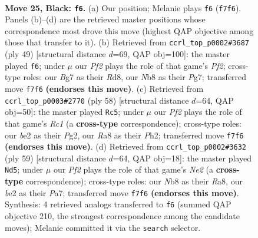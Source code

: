 \documentclass[11pt]{article}
\begin{document}
\clearpage

\begin{figure}[p]\centering
\begin{subfigure}{0.46\textwidth}\centering
\resizebox{\linewidth}{!}{%
\newchessgame
\chessboard[
  setfen={rn3k2/p1r2pbp/Pp6/1P1nN2R/4pPP1/8/4B3/R1B1K3 b Q - 2 25},
  showmover=false,
  pgfstyle=straightmove, color=movearrow, markmove={f7-f6}
]}
\caption{}
\end{subfigure}\hfill
\begin{subfigure}{0.46\textwidth}\centering
\resizebox{\linewidth}{!}{%
\newchessgame
\chessboard[
  setfen={3r1bk1/p4pp1/1pnNr2p/3RP3/1PP3P1/P5B1/7P/2R4K b - - 5 25},
  showmover=false,
  pgfstyle=straightmove, color=movearrow, markmove={f7-f6}
]}
\caption{}
\end{subfigure}
\\[4pt]
\begin{subfigure}{0.46\textwidth}\centering
\resizebox{\linewidth}{!}{%
\newchessgame
\chessboard[
  setfen={r7/1r3pk1/2N1pb1p/p2n2p1/3B4/P4P2/KP1R2PP/2R5 w - - 2 30},
  showmover=false,
  pgfstyle=straightmove, color=movearrow, markmove={c1-c5}
]}
\caption{}
\end{subfigure}\hfill
\begin{subfigure}{0.46\textwidth}\centering
\resizebox{\linewidth}{!}{%
\newchessgame
\chessboard[
  setfen={r5k1/p3np2/2pBrb2/2P2Npp/3P4/5R1P/P5P1/3R2K1 b - - 3 30},
  showmover=false,
  pgfstyle=straightmove, color=movearrow, markmove={e7-d5}
]}
\caption{}
\end{subfigure}
\caption{\textbf{Move 25, Black: \texttt{f6}.} (a) Our position; Melanie plays \texttt{f6} (\texttt{f7f6}). Panels (b)--(d) are the retrieved master positions whose correspondence most drove this move (highest QAP objective among those that transfer to it). (b) Retrieved from \texttt{ccrl\_top\_p0002\#3687} (ply 49) [structural distance $d$=69, QAP obj=100]: the master played \texttt{f6}; under $\mu$ our \emph{Pf2} plays the role of that game's \emph{Pf2}; cross-type roles: our \emph{B}g7 as their \emph{R}d8, our \emph{N}b8 as their \emph{P}g7; transferred move \texttt{f7f6} \textbf{(endorses this move)}. (c) Retrieved from \texttt{ccrl\_top\_p0003\#2770} (ply 58) [structural distance $d$=64, QAP obj=50]: the master played \texttt{Rc5}; under $\mu$ our \emph{Pf2} plays the role of that game's \emph{Rc1} (a \textbf{cross-type} correspondence); cross-type roles: our \emph{b}e2 as their \emph{P}g2, our \emph{R}a8 as their \emph{P}h2; transferred move \texttt{f7f6} \textbf{(endorses this move)}. (d) Retrieved from \texttt{ccrl\_top\_p0002\#3632} (ply 59) [structural distance $d$=64, QAP obj=18]: the master played \texttt{Nd5}; under $\mu$ our \emph{Pf2} plays the role of that game's \emph{Ne2} (a \textbf{cross-type} correspondence); cross-type roles: our \emph{N}b8 as their \emph{R}a8, our \emph{b}e2 as their \emph{P}a7; transferred move \texttt{f7f6} \textbf{(endorses this move)}. Synthesis: 4 retrieved analogs transferred to \texttt{f6} (summed QAP objective 210, the strongest correspondence among the candidate moves); Melanie committed it via the \texttt{search} selector.}
\label{fig:thought-m49}
\end{figure}
\end{document}
